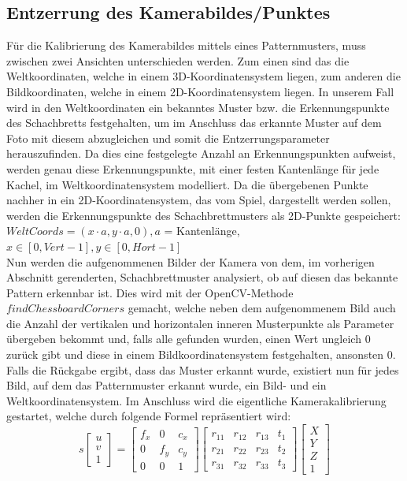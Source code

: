 \subsection{Entzerrung des Kamerabildes/Punktes}
Für die Kalibrierung des Kamerabildes mittels eines Patternmusters, muss zwischen zwei Ansichten unterschieden werden. Zum einen sind das die Weltkoordinaten, welche in einem 3D-Koordinatensystem liegen, zum anderen die Bildkoordinaten, welche in einem 2D-Koordinatensystem liegen. In unserem Fall wird in den Weltkoordinaten ein bekanntes Muster bzw. die Erkennungspunkte des Schachbretts festgehalten, um im Anschluss das erkannte Muster auf dem Foto mit diesem abzugleichen und somit die Entzerrungsparameter herauszufinden. Da dies eine festgelegte Anzahl an Erkennungspunkten aufweist, werden genau diese Erkennungspunkte, mit einer festen Kantenlänge für jede Kachel, im Weltkoordinatensystem modelliert. Da die übergebenen Punkte nachher in ein 2D-Koordinatensystem, das vom Spiel, dargestellt werden sollen, werden die Erkennungspunkte des Schachbrettmusters als 2D-Punkte gespeichert:\\
$WeltCoords = (x \cdot a, y \cdot a, 0), a$ = Kantenlänge, $x \in [0,Vert-1], y \in [0,Hort-1]$\\
Nun werden die aufgenommenen Bilder der Kamera von dem, im vorherigen Abschnitt gerenderten, Schachbrettmuster analysiert, ob auf diesen das bekannte Pattern erkennbar ist. Dies wird mit der OpenCV-Methode $findChessboardCorners$ gemacht, welche neben dem aufgenommenem Bild auch die Anzahl der vertikalen und horizontalen inneren Musterpunkte als Parameter übergeben bekommt und, falls alle gefunden wurden, einen Wert ungleich 0 zurück gibt und diese in einem Bildkoordinatensystem festgehalten, ansonsten 0. Falls die Rückgabe ergibt, dass das Muster erkannt wurde, existiert nun für jedes Bild, auf dem das Patternmuster erkannt wurde, ein Bild- und ein Weltkoordinatensystem.
Im Anschluss wird die eigentliche Kamerakalibrierung gestartet, welche durch folgende Formel repräsentiert wird:\\
\[s
\begin{bmatrix}
u\\v\\1
\end{bmatrix}=
\begin{bmatrix}
f_{x} & 0 & c_{x}\\
0 & f_{y} & c_{y}\\
0 & 0 & 1
\end{bmatrix}
\begin{bmatrix}
r_{11} & r_{12} & r_{13} & t_{1} \\
r_{21} & r_{22} & r_{23} & t_{2} \\
r_{31} & r_{32} & r_{33} & t_{3}
\end{bmatrix}
\begin{bmatrix}
X\\Y\\Z\\1
\end{bmatrix}
\]
